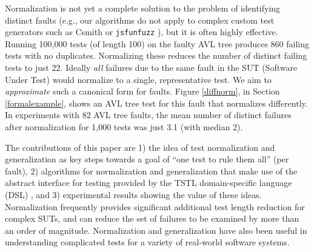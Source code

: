 Normalization is not yet a complete solution to the problem of identifying
distinct faults (e.g., our algorithms do not apply to complex custom
test generators such as Csmith \cite{csmith} or {\tt jsfunfuzz}
\cite{jsfunfuzz}), but it is often highly effective.  Running 100,000
tests (of length 100) on the faulty AVL tree produces 860 failing tests with no duplicates.  Normalizing these reduces the number of
distinct failing tests to just 22.  Ideally \emph{all} failures
due to the same fault in the SUT (Software Under Test) would normalize
to a single, representative test.  We aim to
\emph{approximate} such a canonical form for faults.  Figure \ref{diffnorm},
in Section \ref{formalexample}, shows an AVL tree test for this fault that
normalizes differently.  
 In experiments with 82 AVL tree faults,
the mean number of distinct failures after normalization for 1,000
tests was just 3.1 (with median 2). 

The contributions of this paper are 1) the idea of test normalization and
generalization as key steps towards a goal of
``one test to rule them all'' (per fault), 2) algorithms for
normalization and generalization that make use of the abstract
interface for testing provided by the TSTL \cite{tstl,NFM15,ISSTA15,tstlsttt}
domain-specific language (DSL) \cite{Fow10}, and 3)
experimental results showing the value of these ideas.  Normalization frequently provides significant additional test length
reduction for complex SUTs, and can reduce
the set of failures to be examined by more than an order of
magnitude.  Normalization and generalization have also been useful in
understanding complicated tests for a variety of real-world software
systems.


